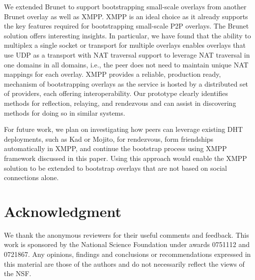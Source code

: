 \documentclass[conference]{IEEEtran}
\begin{document}
We extended Brunet to support bootstrapping small-scale overlays from another
Brunet overlay as well as XMPP.  XMPP is an ideal choice as it already supports
the key features required for bootstrapping small-scale P2P overlays.  The
Brunet solution offers interesting insights. In particular, we have found that
the ability to multiplex a single socket or transport for multiple overlays
enables overlays that use UDP as a transport with NAT traversal support to
leverage NAT traversal in one domains in all domains, i.e., the peer does not
need to maintain unique NAT mappings for each overlay.  XMPP provides a
reliable, production ready, mechanism of bootstrapping overlays as the service
is hosted by a distributed set of providers, each offering interoperability.
Our prototype clearly identifies methods for reflection, relaying, and
rendezvous and can assist in discovering methods for doing so in similar
systems.

For future work, we plan on investigating how peers can leverage existing DHT
deployments, such as Kad or Mojito, for rendezvous, form friendships
automatically in XMPP, and continue the bootstrap process using XMPP framework
discussed in this paper.  Using this approach would enable the XMPP solution to
be extended to bootstrap overlays that are not based on social connections
alone.

\section{Acknowledgment}

We thank the anonymous reviewers for their useful comments and feedback.  This
work is sponsored by the National Science Foundation under awards 0751112 and
0721867. Any opinions, findings and conclusions or recommendations expressed in
this material are those of the authors and do not necessarily reflect the views
of the NSF.



\suppressfloats
\end{document}
